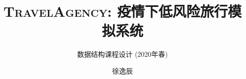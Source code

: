 \documentclass{cpp}
\title{\textsc{TravelAgency}: 疫情下低风险旅行模拟系统}
\subtitle{数据结构课程设计 (2020年春)}
\author[1,2]{徐逸辰}
\affil[1]{北京邮电大学，计算机学院}
\affil[2]{2018213555}
\theoremstyle{nobreak}
\theoremstyle{nonumberplain}
\begin{document}
\maketitle


\setcounter{tocdepth}{1}
\tableofcontents

\newpage













\newpage

\begin{appendices}

\end{appendices}
\end{document}
